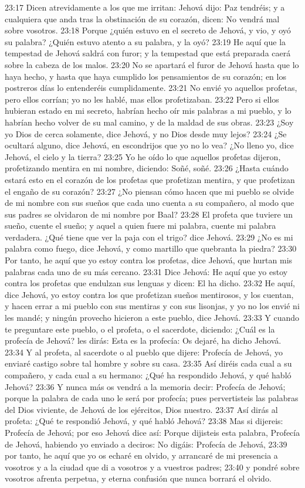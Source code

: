 23:17 Dicen atrevidamente a los que me irritan: Jehová dijo: Paz tendréis; y a cualquiera que anda tras la obstinación de su corazón, dicen: No vendrá mal sobre vosotros. 
23:18 Porque ¿quién estuvo en el secreto de Jehová, y vio, y oyó su palabra? ¿Quién estuvo atento a su palabra, y la oyó? 
23:19 He aquí que la tempestad de Jehová saldrá con furor; y la tempestad que está preparada caerá sobre la cabeza de los malos. 
23:20 No se apartará el furor de Jehová hasta que lo haya hecho, y hasta que haya cumplido los pensamientos de su corazón; en los postreros días lo entenderéis cumplidamente. 
23:21 No envié yo aquellos profetas, pero ellos corrían; yo no les hablé, mas ellos profetizaban. 
23:22 Pero si ellos hubieran estado en mi secreto, habrían hecho oír mis palabras a mi pueblo, y lo habrían hecho volver de su mal camino, y de la maldad de sus obras. 
23:23 ¿Soy yo Dios de cerca solamente, dice Jehová, y no Dios desde muy lejos? 
23:24 ¿Se ocultará alguno, dice Jehová, en escondrijos que yo no lo vea? ¿No lleno yo, dice Jehová, el cielo y la tierra? 
23:25 Yo he oído lo que aquellos profetas dijeron, profetizando mentira en mi nombre, diciendo: Soñé, soñé. 
23:26 ¿Hasta cuándo estará esto en el corazón de los profetas que profetizan mentira, y que profetizan el engaño de su corazón? 
23:27 ¿No piensan cómo hacen que mi pueblo se olvide de mi nombre con sus sueños que cada uno cuenta a su compañero, al modo que sus padres se olvidaron de mi nombre por Baal? 
23:28 El profeta que tuviere un sueño, cuente el sueño; y aquel a quien fuere mi palabra, cuente mi palabra verdadera. ¿Qué tiene que ver la paja con el trigo? dice Jehová. 
23:29 ¿No es mi palabra como fuego, dice Jehová, y como martillo que quebranta la piedra? 
23:30 Por tanto, he aquí que yo estoy contra los profetas, dice Jehová, que hurtan mis palabras cada uno de su más cercano. 
23:31 Dice Jehová: He aquí que yo estoy contra los profetas que endulzan sus lenguas y dicen: El ha dicho. 
23:32 He aquí, dice Jehová, yo estoy contra los que profetizan sueños mentirosos, y los cuentan, y hacen errar a mi pueblo con sus mentiras y con sus lisonjas, y yo no los envié ni les mandé; y ningún provecho hicieron a este pueblo, dice Jehová. 
23:33 Y cuando te preguntare este pueblo, o el profeta, o el sacerdote, diciendo: ¿Cuál es la profecía de Jehová? les dirás: Esta es la profecía: Os dejaré, ha dicho Jehová. 
23:34 Y al profeta, al sacerdote o al pueblo que dijere: Profecía de Jehová, yo enviaré castigo sobre tal hombre y sobre su casa. 
23:35 Así diréis cada cual a su compañero, y cada cual a su hermano: ¿Qué ha respondido Jehová, y qué habló Jehová? 
23:36 Y nunca más os vendrá a la memoria decir: Profecía de Jehová; porque la palabra de cada uno le será por profecía; pues pervertisteis las palabras del Dios viviente, de Jehová de los ejércitos, Dios nuestro. 
23:37 Así dirás al profeta: ¿Qué te respondió Jehová, y qué habló Jehová? 
23:38 Mas si dijereis: Profecía de Jehová; por eso Jehová dice así: Porque dijisteis esta palabra, Profecía de Jehová, habiendo yo enviado a deciros: No digáis: Profecía de Jehová, 
23:39 por tanto, he aquí que yo os echaré en olvido, y arrancaré de mi presencia a vosotros y a la ciudad que di a vosotros y a vuestros padres; 
23:40 y pondré sobre vosotros afrenta perpetua, y eterna confusión que nunca borrará el olvido. 
